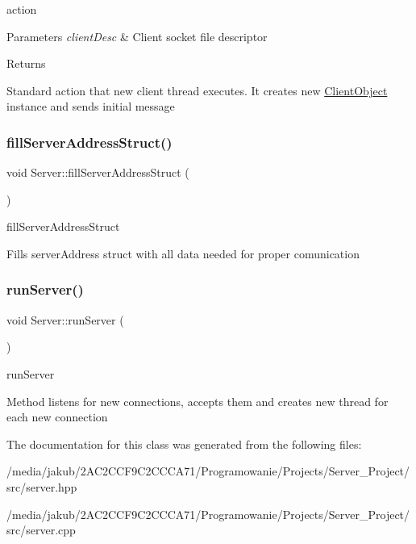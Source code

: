 action 


\begin{DoxyParams}{Parameters}
{\em client\+Desc} & Client socket file descriptor \\
\hline
\end{DoxyParams}
\begin{DoxyReturn}{Returns}

\end{DoxyReturn}
Standard action that new client thread executes. It creates new \hyperlink{classClientObject}{Client\+Object} instance and sends initial message \mbox{\label{classServer_a684bf0fce1ec62711a60d0cc3d25e8f8}} 
\subsubsection{\texorpdfstring{fill\+Server\+Address\+Struct()}{fillServerAddressStruct()}}
{\footnotesize\ttfamily void Server\+::fill\+Server\+Address\+Struct (\begin{DoxyParamCaption}{ }\end{DoxyParamCaption})\hspace{0.3cm}{\ttfamily [private]}}



fill\+Server\+Address\+Struct 

Fills server\+Address struct with all data needed for proper comunication \mbox{\label{classServer_a5dfdd750d32aa4adbb4fdd8ba29b1224}} 
\subsubsection{\texorpdfstring{run\+Server()}{runServer()}}
{\footnotesize\ttfamily void Server\+::run\+Server (\begin{DoxyParamCaption}{ }\end{DoxyParamCaption})}



run\+Server 

Method listens for new connections, accepts them and creates new thread for each new connection 

The documentation for this class was generated from the following files\+:\begin{DoxyCompactItemize}
\item 
/media/jakub/2\+A\+C2\+C\+C\+F9\+C2\+C\+C\+C\+A71/\+Programowanie/\+Projects/\+Server\+\_\+\+Project/src/server.\+hpp\item 
/media/jakub/2\+A\+C2\+C\+C\+F9\+C2\+C\+C\+C\+A71/\+Programowanie/\+Projects/\+Server\+\_\+\+Project/src/server.\+cpp\end{DoxyCompactItemize}
